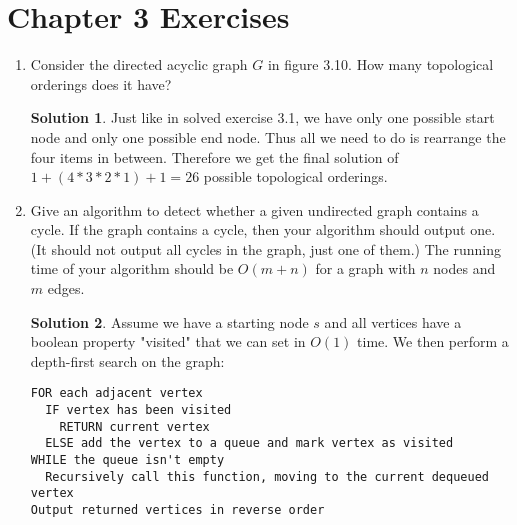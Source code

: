 \documentclass[12pt]{article}
\theoremstyle{definition}
\newtheorem*{solution}{Solution} %
\theoremstyle{plain}
\begin{document}
\section*{Chapter 3 Exercises}
\begin{enumerate}
\item Consider the directed acyclic graph $G$ in figure 3.10. How many topological orderings does it have?
\begin{solution}
Just like in solved exercise 3.1, we have only one possible start node and only one possible end node. Thus all we need to do is rearrange the four items in between. Therefore we get the final solution of $1+(4*3*2*1)+1 = 26$ possible topological orderings.
\end{solution}

\item Give an algorithm to detect whether a given undirected graph contains a cycle. If the graph contains a cycle, then your algorithm should output one. (It should not output all cycles in the graph, just one of them.) The running time of your algorithm should be $O(m+n)$ for a graph with $n$ nodes and $m$ edges.
\begin{solution}
Assume we have a starting node $s$ and all vertices have a boolean property "visited" that we can set in $O(1)$ time. We then perform a depth-first search on the graph:
\begin{verbatim}
FOR each adjacent vertex
  IF vertex has been visited
    RETURN current vertex
  ELSE add the vertex to a queue and mark vertex as visited
WHILE the queue isn't empty
  Recursively call this function, moving to the current dequeued vertex
Output returned vertices in reverse order
\end{verbatim}
\end{solution}


\end{enumerate}
\end{document}
